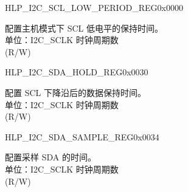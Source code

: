 \begin{register}{H}{LP\_I2C\_SCL\_LOW\_PERIOD\_REG}{0x0000}\label{regdesc:LPI2CSCLLOWPERIODREG}
%
%
\regnewline%
\begin{regdesc}\begin{reglist}
\label{fielddesc:LPI2CSCLLOWPERIOD}\item [LP\_I2C\_SCL\_LOW\_PERIOD] 配置主机模式下 SCL 低电平的保持时间。\\
单位：I2C\_SCLK 时钟周期数 \\ (R/W)
\end{reglist}\end{regdesc}
\end{register}


\begin{register}{H}{LP\_I2C\_SDA\_HOLD\_REG}{0x0030}\label{regdesc:LPI2CSDAHOLDREG}
%
%
\regnewline%
\begin{regdesc}\begin{reglist}
\label{fielddesc:LPI2CSDAHOLDTIME}\item [LP\_I2C\_SDA\_HOLD\_TIME] 配置 SCL 下降沿后的数据保持时间。\\
单位：I2C\_SCLK 时钟周期数 \\ (R/W)
\end{reglist}\end{regdesc}
\end{register}


\begin{register}{H}{LP\_I2C\_SDA\_SAMPLE\_REG}{0x0034}\label{regdesc:LPI2CSDASAMPLEREG}
%
%
\regnewline%
\begin{regdesc}\begin{reglist}
\label{fielddesc:LPI2CSDASAMPLETIME}\item [LP\_I2C\_SDA\_SAMPLE\_TIME] 配置采样 SDA 的时间。\\
单位：I2C\_SCLK 时钟周期数 \\ (R/W)
\end{reglist}\end{regdesc}
\end{register}


